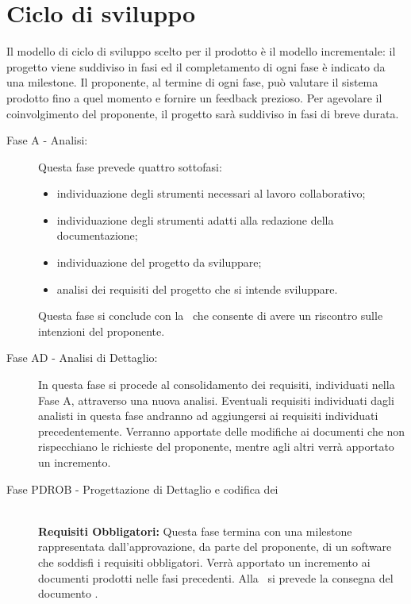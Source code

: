 \documentclass[../PianoProgetto.tex]{subfiles}
\begin{document}
\section{Ciclo di sviluppo}

	Il modello di ciclo di sviluppo scelto per il prodotto è il modello incrementale: il progetto viene suddiviso in fasi ed il completamento di ogni fase è indicato da una milestone.
	Il proponente, al termine di ogni fase, può valutare il sistema prodotto fino a quel momento e fornire un feedback prezioso.
	Per agevolare il coinvolgimento del proponente, il progetto sarà suddiviso in fasi di breve durata.
	\begin{description}
	
	\item[Fase A - Analisi:] Questa fase prevede quattro sottofasi:
		\begin{itemize}
		\item individuazione degli strumenti necessari al lavoro collaborativo;
		\item individuazione degli strumenti adatti alla redazione della documentazione;
		\item individuazione del progetto da sviluppare;
		\item analisi dei requisiti del progetto che si intende sviluppare.
		\end{itemize}
		Questa fase si conclude con la \revisionedeirequisiti\ che consente di avere un riscontro sulle intenzioni del proponente.


	\item[Fase AD - Analisi di Dettaglio:] In questa fase si procede al consolidamento dei requisiti, individuati nella Fase A, attraverso una nuova analisi.
		Eventuali requisiti individuati dagli analisti in questa fase andranno ad aggiungersi ai requisiti individuati precedentemente. 
		Verranno apportate delle modifiche ai documenti che non rispecchiano le richieste del proponente, mentre agli altri verrà apportato un incremento.


	\item[Fase PDROB - Progettazione di Dettaglio e codifica dei] \ \\
		\textbf{ Requisiti Obbligatori:}
		Questa fase termina con una milestone rappresentata dall'approvazione, da parte del proponente, di un software che soddisfi i requisiti obbligatori.
		Verrà apportato un incremento ai documenti prodotti nelle fasi precedenti.
		Alla \revisionediprogettazione\ si prevede la consegna del documento  .
  

\end{description}
\end{document}
